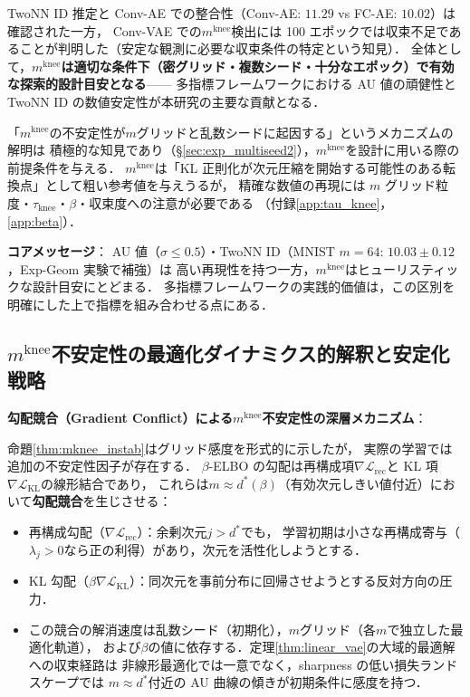 \documentclass[11pt,a4paper]{jsarticle}
\newcommand{\mknee}{m^{\mathrm{knee}}}
\begin{document}
TwoNN ID 推定と Conv-AE での整合性（Conv-AE: $11.29$ vs FC-AE: $10.02$）は確認された一方，
Conv-VAE での$\mknee$検出には 100 エポックでは収束不足であることが判明した（安定な観測に必要な収束条件の特定という知見）．
全体として，\textbf{$\mknee$は適切な条件下（密グリッド・複数シード・十分なエポック）で有効な探索的設計目安となる}——
多指標フレームワークにおける AU 値の頑健性と TwoNN ID の数値安定性が本研究の主要な貢献となる．

「$\mknee$の不安定性が$m$グリッドと乱数シードに起因する」というメカニズムの解明は
積極的な知見であり（§\ref{sec:exp_multiseed2}），$\mknee$を設計に用いる際の前提条件を与える．
$\mknee$は「KL 正則化が次元圧縮を開始する可能性のある転換点」として粗い参考値を与えうるが，
精確な数値の再現には $m$ グリッド粒度・$\tau_\mathrm{knee}$・$\beta$・収束度への注意が必要である
（付録\ref{app:tau_knee}，\ref{app:beta}）．

\textbf{コアメッセージ}：
AU 値（$\sigma \leq 0.5$）・TwoNN ID（MNIST $m=64$: $10.03 \pm 0.12$，Exp-Geom 実験で補強）は
高い再現性を持つ一方，$\mknee$はヒューリスティックな設計目安にとどまる．
多指標フレームワークの実践的価値は，この区別を明確にした上で指標を組み合わせる点にある．

\subsection{$\mknee$不安定性の最適化ダイナミクス的解釈と安定化戦略}\label{sec:disc_mknee_improve}

\textbf{勾配競合（Gradient Conflict）による$\mknee$不安定性の深層メカニズム}：

命題\ref{thm:mknee_instab}はグリッド感度を形式的に示したが，
実際の学習では追加の不安定性因子が存在する．
$\beta$-ELBO の勾配は再構成項$\nabla\mathcal{L}_\mathrm{rec}$と
KL 項$\nabla\mathcal{L}_\mathrm{KL}$の線形結合であり，
これらは$m \approx d^*(\beta)$（有効次元しきい値付近）において\textbf{勾配競合}を生じさせる：

\begin{itemize}
  \item 再構成勾配（$\nabla\mathcal{L}_\mathrm{rec}$）：余剰次元$j > d^*$でも，
        学習初期は小さな再構成寄与（$\lambda_j > 0$なら正の利得）があり，次元を活性化しようとする．
  \item KL 勾配（$\beta\nabla\mathcal{L}_\mathrm{KL}$）：同次元を事前分布に回帰させようとする反対方向の圧力．
  \item この競合の解消速度は乱数シード（初期化），$m$グリッド（各$m$で独立した最適化軌道），
        および$\beta$の値に依存する．定理\ref{thm:linear_vae}の大域的最適解への収束経路は
        非線形最適化では一意でなく，sharpness の低い損失ランドスケープでは
        $m \approx d^*$付近の AU 曲線の傾きが初期条件に感度を持つ．
\end{itemize}
\end{document}
